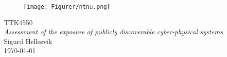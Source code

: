 \documentclass{article}
\begin{document}
\begin{titlepage}
      \begin{center}
        \begin{figure}[h!]
            \centering
            \texttt{[image: Figurer/ntnu.png]}
            \label{fig:ntnu}
        \end{figure} 
        \vspace*{1cm}
        {\Large{TTK4550}}\\[0.4cm] 
        {\Huge{\textit{Assessment of the exposure of publicly discoverable cyber-physical systems }}}\\[0.5cm]
        {\Large{Sigurd Hellesvik}}\\[0.4cm] 
        \large{\today}
        \vspace{1cm}
    \end{center}
    \vspace*{\fill}
\end{titlepage}


\thispagestyle{empty} %
\linespread{1.15}

\newpage

\newpage
\tableofcontents

\def\tableofcontentsname{test}
\thispagestyle{empty} %

\newpage
\setcounter{page}{1}
%
%
%





%


%






\newpage
\begin{appendices} \label{appendix}

%



\end{appendices}


\newpage
{}

\end{document}
